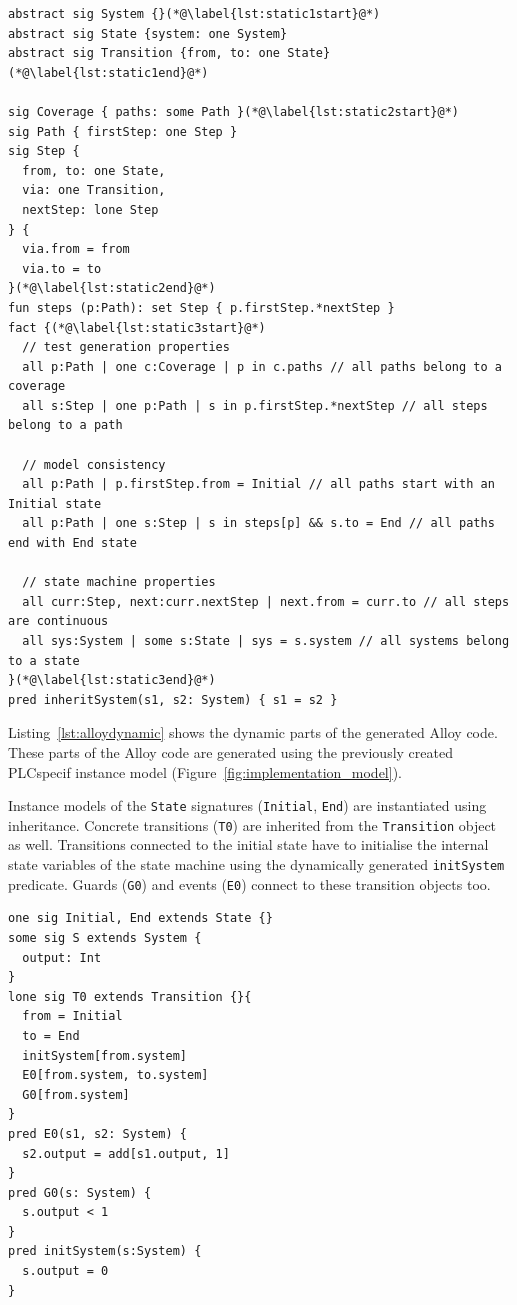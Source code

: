 \begin{lstlisting}[label={lst:alloystatic}, caption=Static parts of the generated Alloy code,breaklines=true]
abstract sig System {}(*@\label{lst:static1start}@*)
abstract sig State {system: one System}
abstract sig Transition {from, to: one State}(*@\label{lst:static1end}@*)

sig Coverage { paths: some Path }(*@\label{lst:static2start}@*)
sig Path { firstStep: one Step }
sig Step {
  from, to: one State,
  via: one Transition,
  nextStep: lone Step
} {
  via.from = from
  via.to = to
}(*@\label{lst:static2end}@*)
fun steps (p:Path): set Step { p.firstStep.*nextStep }
fact {(*@\label{lst:static3start}@*)
  // test generation properties
  all p:Path | one c:Coverage | p in c.paths // all paths belong to a coverage
  all s:Step | one p:Path | s in p.firstStep.*nextStep // all steps belong to a path

  // model consistency
  all p:Path | p.firstStep.from = Initial // all paths start with an Initial state
  all p:Path | one s:Step | s in steps[p] && s.to = End // all paths end with End state
	
  // state machine properties
  all curr:Step, next:curr.nextStep | next.from = curr.to // all steps are continuous
  all sys:System | some s:State | sys = s.system // all systems belong to a state
}(*@\label{lst:static3end}@*)
pred inheritSystem(s1, s2: System) { s1 = s2 }
\end{lstlisting}

Listing~\ref{lst:alloydynamic} shows the dynamic parts of the generated Alloy code. These parts of the Alloy code are generated using the previously created PLCspecif instance model (Figure~\ref{fig:implementation_model}).

Instance models of the \texttt{State} signatures (\texttt{Initial}, \texttt{End}) are instantiated using inheritance. Concrete transitions (\texttt{T0}) are inherited from the \texttt{Transition} object as well. Transitions connected to the initial state have to initialise the internal state variables of the state machine using the dynamically generated \texttt{initSystem} predicate. Guards (\texttt{G0}) and events (\texttt{E0}) connect to these transition objects too.

\begin{lstlisting}[label={lst:alloydynamic}, caption=Dynamic parts of the generated Alloy code,breaklines=true]
one sig Initial, End extends State {}
some sig S extends System {
  output: Int
}
lone sig T0 extends Transition {}{
  from = Initial
  to = End
  initSystem[from.system]
  E0[from.system, to.system]
  G0[from.system]
}
pred E0(s1, s2: System) {
  s2.output = add[s1.output, 1]	
}
pred G0(s: System) {
  s.output < 1
}
pred initSystem(s:System) {
  s.output = 0
}
\end{lstlisting}

